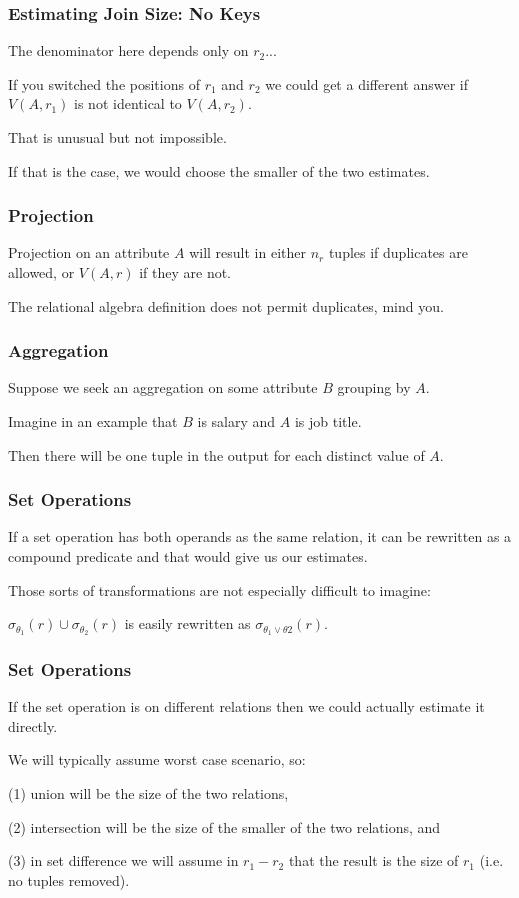 \begin{frame}
\frametitle{Estimating Join Size: No Keys}

The denominator here depends only on $r_{2}$...  

If you switched the positions of $r_{1}$ and $r_{2}$ we could get a different answer if $V(A, r_{1})$ is not identical to $V(A, r_{2})$. 

That is unusual but not impossible. 

If that is the case, we would choose the smaller of the two estimates.

\end{frame}

\begin{frame}
\frametitle{Projection}

Projection on an attribute $A$ will result in either $n_{r}$ tuples if duplicates are allowed, or $V(A, r)$ if they are not. 

The relational algebra definition does not permit duplicates, mind you.

\end{frame}

\begin{frame}
\frametitle{Aggregation}

Suppose we seek an aggregation on some attribute $B$ grouping by $A$.

 Imagine in an example that $B$ is salary and $A$ is job title. 
 
 Then there will be one tuple in the output for each distinct value of $A$.

\end{frame}

\begin{frame}
\frametitle{Set Operations}
If a set operation has both operands as the same relation, it can be rewritten as a compound predicate and that would give us our estimates. 

Those sorts of transformations are not especially difficult to imagine: 

$\sigma_{\theta_{1}}(r) \cup \sigma_{\theta_{2}}(r)$ is easily rewritten as $\sigma_{\theta_{1} \vee \theta{2}}(r)$. 


\end{frame}

\begin{frame}
\frametitle{Set Operations}

If the set operation is on different relations then we could actually estimate it directly. 

We will typically assume worst case scenario, so: 

(1) union will be the size of the two relations, 

(2) intersection will be the size of the smaller of the two relations, and 

(3) in set difference we will assume in $r_{1} - r_{2}$ that the result is the size of $r_{1}$ (i.e. no tuples removed). 

\end{frame}


